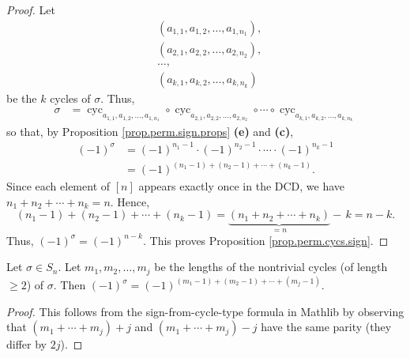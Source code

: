 \begin{proof}
\leanok
Let
\begin{align*}
&  \left(  a_{1,1},a_{1,2},\ldots,a_{1,n_{1}}\right)  ,\\
&  \left(  a_{2,1},a_{2,2},\ldots,a_{2,n_{2}}\right)  ,\\
&  \ldots,\\
&  \left(  a_{k,1},a_{k,2},\ldots,a_{k,n_{k}}\right)
\end{align*}
be the $k$ cycles of $\sigma$. Thus,
\begin{align*}
\sigma &  =\operatorname*{cyc}\nolimits_{a_{1,1},a_{1,2},\ldots,a_{1,n_{1}}%
}\circ\operatorname*{cyc}\nolimits_{a_{2,1},a_{2,2},\ldots,a_{2,n_{2}}}%
\circ\cdots\circ\operatorname*{cyc}\nolimits_{a_{k,1},a_{k,2},\ldots
,a_{k,n_{k}}}
\end{align*}
so that, by Proposition
\ref{prop.perm.sign.props} \textbf{(e)} and \textbf{(c)},
\begin{align*}
\left(  -1\right)  ^{\sigma}
&  =\left(  -1\right)  ^{n_{1}-1}\cdot\left(  -1\right)  ^{n_{2}-1}\cdot
\cdots\cdot\left(  -1\right)  ^{n_{k}-1}\\
&  =\left(  -1\right)  ^{\left(  n_{1}-1\right)  +\left(  n_{2}-1\right)
+\cdots+\left(  n_{k}-1\right)  }.
\end{align*}
Since each element of $\left[  n\right]  $ appears exactly once in the
DCD, we have $n_{1}+n_{2}+\cdots+n_{k}=n$. Hence,%
\[
\left(  n_{1}-1\right)  +\left(  n_{2}-1\right)  +\cdots+\left(
n_{k}-1\right)  =\underbrace{\left(  n_{1}+n_{2}+\cdots+n_{k}\right)  }%
_{=n}-\,k=n-k.
\]
Thus, $\left(  -1\right)
^{\sigma}=\left(  -1\right)  ^{n-k}$. This proves Proposition
\ref{prop.perm.cycs.sign}.
\end{proof}

\begin{lemma}
\label{lem.sign_eq_neg_one_pow_sum_cycle_lengths_minus_one}
\leanhelper
\leanok
Let $\sigma \in S_n$. Let $m_1, m_2, \ldots, m_j$ be the lengths of the
nontrivial cycles (of length $\geq 2$) of $\sigma$. Then
$(-1)^{\sigma} = (-1)^{(m_1 - 1) + (m_2 - 1) + \cdots + (m_j - 1)}$.
\end{lemma}

\begin{proof}
\leanok
This follows from the sign-from-cycle-type formula in Mathlib by observing that
$(m_1 + \cdots + m_j) + j$ and $(m_1 + \cdots + m_j) - j$ have the
same parity (they differ by $2j$).
\end{proof}

